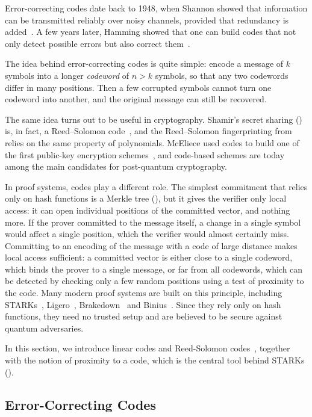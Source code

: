 \documentclass[../../book]{subfiles}
\begin{document}
Error-correcting codes date back to 1948, when Shannon showed that information can be transmitted reliably over noisy channels, provided that redundancy is added~\cite{shannon1948}. A few years later, Hamming showed that one can build codes that not only detect possible errors but also correct them~\cite{hamming1950}.

The idea behind error-correcting codes is quite simple: encode a message of $k$ symbols into a longer \emph{codeword} of $n > k$ symbols, so that any two codewords differ in many positions. Then a few corrupted symbols cannot turn one codeword into another, and the original message can still be recovered.

The same idea turns out to be useful in cryptography. Shamir's secret sharing () is, in fact, a Reed--Solomon code~\cite{mceliece1981}, and the Reed--Solomon fingerprinting from  relies on the same property of polynomials. McEliece used codes to build one of the first public-key encryption schemes~\cite{McEliece78}, and code-based schemes are today among the main candidates for post-quantum cryptography.

In proof systems, codes play a different role. The simplest commitment that relies only on hash functions is a Merkle tree (), but it gives the verifier only local access: it can open individual positions of the committed vector, and nothing more. If the prover committed to the message itself, a change in a single symbol would affect a single position, which the verifier would almost certainly miss. Committing to an encoding of the message with a code of large distance makes local access sufficient: a committed vector is either close to a single codeword, which binds the prover to a single message, or far from all codewords, which can be detected by checking only a few random positions using a test of proximity to the code. Many modern proof systems are built on this principle, including STARKs~\cite{EPRINT:BBHR18}, Ligero~\cite{CCS:AHIV17}, Brakedown~\cite{C:GLSTW23} and Binius~\cite{EC:DiaPos25}. Since they rely only on hash functions, they need no trusted setup and are believed to be secure against quantum adversaries.

In this section, we introduce linear codes and Reed-Solomon codes~\cite{guruswami23}, together with the notion of proximity to a code, which is the central tool behind STARKs ().

\subsection{Error-Correcting Codes}
\end{document}
